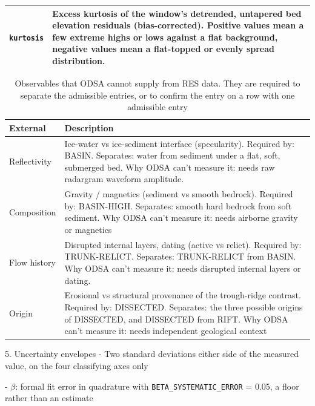 \begin{table}
\begin{tabularx}{\textwidth}{p{4.0cm} X}
  \addlinespace[0.5em]
  \texttt{kurtosis} & Excess kurtosis of the window's detrended, untapered bed elevation residuals (bias-corrected). Positive values mean a few extreme highs or lows against a flat background, negative values mean a flat-topped or evenly spread distribution.\\
\bottomrule
\end{tabularx}
\end{table}

\begin{table}
\centering
\caption{Observables that ODSA cannot supply from RES data. They are required to separate the admissible entries, or to confirm the entry on a row with one admissible entry}
\label{tab:externals}
\begin{tabularx}{\textwidth}{p{4.0cm} X}
\toprule
\textbf{External} & \textbf{Description} \\
\midrule
  Reflectivity & Ice-water vs ice-sediment interface (specularity). Required by: BASIN. Separates: water from sediment under a flat, soft, submerged bed. Why ODSA can't measure it: needs raw radargram waveform amplitude. \\
  \addlinespace[0.5em]
  Composition & Gravity / magnetics (sediment vs smooth bedrock). Required by: BASIN-HIGH. Separates: smooth hard bedrock from soft sediment. Why ODSA can't measure it: needs airborne gravity or magnetics\\
  \addlinespace[0.5em]
  Flow history & Disrupted internal layers, dating (active vs relict). Required by: TRUNK-RELICT. Separates: TRUNK-RELICT from BASIN. Why ODSA can't measure it: needs disrupted internal layers or dating. \\
  \addlinespace[0.5em]
  Origin & Erosional vs structural provenance of the trough-ridge contrast. Required by: DISSECTED. Separates: the three possible origins of DISSECTED, and DISSECTED from RIFT. Why ODSA can't measure it: needs independent geological context\\
\bottomrule
\end{tabularx}
\end{table}






5. Uncertainty envelopes
  - Two standard deviations either side of the measured value, on the four classifying axes only

  - $\beta$: formal fit error in quadrature with \texttt{BETA\_SYSTEMATIC\_ERROR} = 0.05, a floor rather than an estimate

